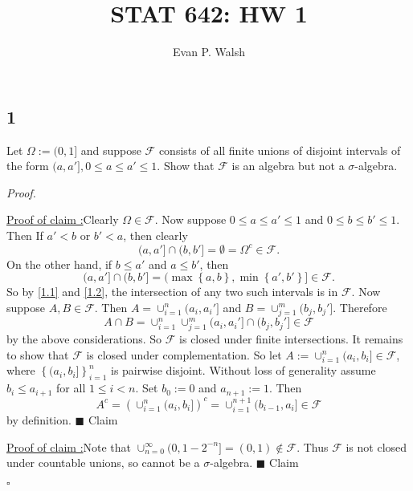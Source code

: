 \documentclass[12pt]{article}
\title{STAT 642: HW 1}
\author{Evan P. Walsh}
\newcounter{ProofCounter}
\newcounter{ClaimCounter}[ProofCounter]
\newenvironment{Proof}{\stepcounter{ProofCounter}\textit{Proof.}}{\hfill$\square$}
\newenvironment{claim}[1]{\vspace{1mm}\stepcounter{ClaimCounter}\par\noindent\underline{\bf Claim \theClaimCounter:}\space#1}{}
\newenvironment{claimproof}[1]{\par\noindent\underline{Proof of claim \theClaimCounter:}\space#1}{\hfill $\blacksquare$ Claim \theClaimCounter}
\begin{document}
\maketitle

\subsection*{1}
\begin{tcolorbox}
Let $\Omega := (0,1]$ and suppose $\mathcal{F}$ consists of all finite unions of disjoint intervals of the form $(a,a'], 0 \leq a \leq a' \leq 1$.
Show that $\mathcal{F}$ is an algebra but not a $\sigma$-algebra.
\end{tcolorbox}

\begin{Proof} 

\begin{claimproof}
Clearly $\Omega \in \mathcal{F}$. Now suppose $0 \leq a \leq a' \leq 1$ and $0 \leq b \leq b' \leq 1$. Then 
If $a' < b$ or $b' < a$, then clearly 
\begin{equation}
(a,a'] \cap (b,b'] = \emptyset = \Omega^{c} \in \mathcal{F}.
\label{1.1}
\end{equation}
On the other hand, if $b \leq a'$ and $a \leq b'$, then 
\begin{equation}
(a,a'] \cap (b,b'] = (\max\left\{ a,b \right\}, \min\left\{ a',b' \right\}] \in \mathcal{F}.
\label{1.2}
\end{equation}
So by \eqref{1.1} and \eqref{1.2}, the intersection of any two such intervals is in $\mathcal{F}$. Now suppose $A, B \in \mathcal{F}$. Then $A =
\cup_{i=1}^{n}(a_{i}, a_{i}']$ and $B = \cup_{j=1}^{m}(b_{j},b_{j}']$. Therefore 
\[ A\cap B = \cup_{i=1}^{n}\cup_{j=1}^{m}(a_{i},a_{i}']\cap (b_{j},b_{j}'] \in \mathcal{F} \]
by the above considerations. So $\mathcal{F}$ is closed under finite intersections. It remains to show that $\mathcal{F}$ is closed under
complementation. So let $A := \cup_{i=1}^{n}(a_{i},b_{i}] \in \mathcal{F}$, where $\left\{ (a_{i},b_{i}] \right\}_{i=1}^{n}$ is pairwise disjoint.
Without loss of generality assume $b_{i} \leq a_{i+1}$ for all $1\leq i < n$. Set $b_{0} := 0$ and $a_{n+1} := 1$. Then 
\[ A^{c} = \left( \cup_{i=1}^{n}(a_{i},b_{i}] \right)^{c} = \cup_{i=1}^{n+1}(b_{i-1},a_{i}] \in \mathcal{F} \]
by definition.
\end{claimproof}

\begin{claimproof}
Note that $\cup_{n=0}^{\infty}(0,1-2^{-n}] = (0,1) \notin \mathcal{F}$. Thus $\mathcal{F}$ is not closed under countable unions, so cannot be a $\sigma$-algebra.
\end{claimproof}

\end{Proof}
\end{document}
